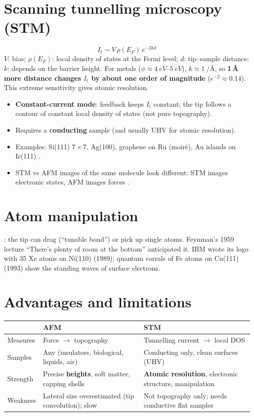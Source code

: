 \section{Scanning tunnelling microscopy (STM)}
\begin{keybox}
\begin{equation}
I_t \sim V\,\rho(E_F)\,e^{-2kd}
\end{equation}
$V$: bias; $\rho(E_F)$: local density of states at the Fermi level; $d$: tip--sample distance; $k$: depends on the
barrier height. For metals ($\phi\approx\SIrange{4}{5}{eV}$), $k\approx\SI{1}{\per\angstrom}$, so \textbf{1\,\AA{} more
distance changes $I_t$ by about one order of magnitude} ($e^{-2}\approx 0.14$). This extreme sensitivity gives
atomic resolution.
\end{keybox}
\begin{itemize}
  \item \textbf{Constant-current mode}: feedback keeps $I_t$ constant; the tip follows a contour of constant local
        density of states (not pure topography).
  \item Requires a \textbf{conducting} sample (and usually UHV for atomic resolution).
  \item Examples: Si(111) $7\times7$, Ag(100), graphene on Ru (moir\'e), Au islands on Ir(111) .
  \item STM vs AFM images of the same molecule look different: STM images electronic states, AFM images forces
        .
\end{itemize}

\section{Atom manipulation}
: the tip can drag (``tunable bond'') or pick up single atoms. Feynman's 1959 lecture ``There's plenty
of room at the bottom'' anticipated it. IBM wrote its logo with 35 Xe atoms on Ni(110) (1989); quantum corrals of
Fe atoms on Cu(111) (1993) show the standing waves of surface electrons.

\section{Advantages and limitations}
\begin{center}
\renewcommand{\arraystretch}{1.25}
\begin{tabularx}{\linewidth}{@{}lXX@{}}
\toprule
 & \textbf{AFM} & \textbf{STM} \\ \midrule
Measures & Force $\to$ topography & Tunnelling current $\to$ local DOS \\
Samples & Any (insulators, biological, liquids, air) & Conducting only, clean surfaces (UHV) \\
Strength & Precise \textbf{heights}, soft matter, capping shells & \textbf{Atomic resolution}, electronic structure, manipulation \\
Weakness & Lateral size overestimated (tip convolution); slow & Not topography only; needs conductive flat samples \\
\bottomrule
\end{tabularx}
\end{center}
